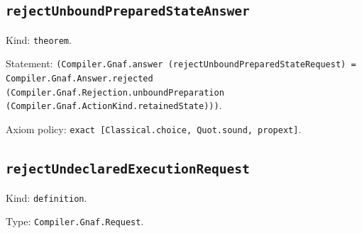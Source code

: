 \documentclass[11pt]{article}
\begin{document}
\subsection*{\texttt{rejectUnboundPreparedStateAnswer}}
\noindent Kind: \texttt{theorem}.\par
\noindent Statement: \texttt{(Compiler.Gnaf.answer (rejectUnboundPreparedStateRequest) = Compiler.Gnaf.Answer.rejected (Compiler.Gnaf.Rejection.unboundPreparation (Compiler.Gnaf.ActionKind.retainedState)))}.\par
\noindent Axiom policy: \texttt{exact [Classical.choice, Quot.sound, propext]}.\par
\subsection*{\texttt{rejectUndeclaredExecutionRequest}}
\noindent Kind: \texttt{definition}.\par
\noindent Type: \texttt{Compiler.Gnaf.Request}.\par
\end{document}
